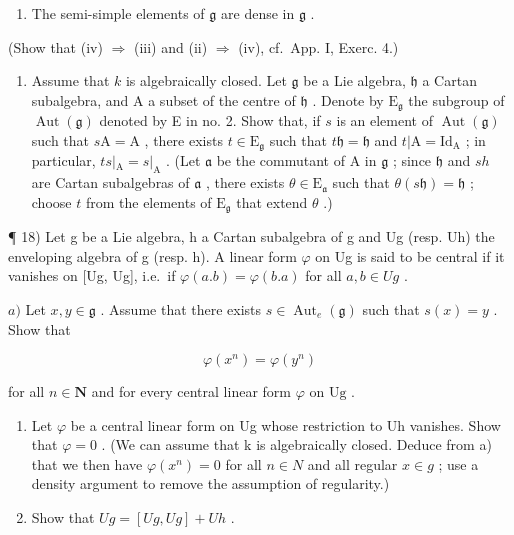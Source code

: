 \begin{enumerate}
\def\labelenumi{(\roman{enumi})}
\setcounter{enumi}{3}
\tightlist
\item
  The semi-simple elements of \(\mathfrak{g}\) are dense in \(\mathfrak{g}\) .
\end{enumerate}

(Show that (iv) \(\Longrightarrow\) (iii) and (ii) \(\Longrightarrow\) (iv), cf.~App. I, Exerc. 4.)

\begin{enumerate}
\def\labelenumi{\arabic{enumi})}
\setcounter{enumi}{16}
\tightlist
\item
  Assume that \(k\) is algebraically closed. Let \(\mathfrak{g}\) be a Lie algebra, \(\mathfrak{h}\) a Cartan subalgebra, and A a subset of the centre of \(\mathfrak{h}\) . Denote by \(\mathrm{E}_{\mathfrak{g}}\) the subgroup of \(\operatorname{Aut}(\mathfrak{g})\) denoted by E in no. 2. Show that, if \(s\) is an element of \(\operatorname{Aut}(\mathfrak{g})\) such that \(s\mathrm{A} = \mathrm{A}\) , there exists \(t \in \mathrm{E}_{\mathfrak{g}}\) such that \(t\mathfrak{h} = \mathfrak{h}\) and \(t|\mathrm{A} = \mathrm{Id}_{\mathrm{A}}\) ; in particular, \(ts|_{\mathrm{A}} = s|_{\mathrm{A}}\) . (Let \(\mathfrak{a}\) be the commutant of A in \(\mathfrak{g}\) ; since \(\mathfrak{h}\) and \(sh\) are Cartan subalgebras of \(\mathfrak{a}\) , there exists \(\theta \in \mathrm{E}_{\mathfrak{a}}\) such that \(\theta(s\mathfrak{h}) = \mathfrak{h}\) ; choose \(t\) from the elements of \(\mathrm{E}_{\mathfrak{g}}\) that extend \(\theta\) .)
\end{enumerate}

¶ 18) Let g be a Lie algebra, h a Cartan subalgebra of g and Ug (resp. Uh) the enveloping algebra of g (resp. h). A linear form \(\varphi\) on Ug is said to be central if it vanishes on {[}Ug, Ug{]}, i.e.~if \(\varphi(a.b) = \varphi(b.a)\) for all \(a, b \in Ug\) .

\(a)\) Let \(x, y \in \mathfrak{g}\) . Assume that there exists \(s \in \operatorname{Aut}_e(\mathfrak{g})\) such that \(s(x) = y\) . Show that

\[
\varphi (x ^ {n}) = \varphi (y ^ {n})
\]

for all \(n \in \mathbf{N}\) and for every central linear form \(\varphi\) on \(\mathrm{Ug}\) .

\begin{enumerate}
\def\labelenumi{\alph{enumi})}
\setcounter{enumi}{1}
\item
  Let \(\varphi\) be a central linear form on Ug whose restriction to Uh vanishes. Show that \(\varphi = 0\) . (We can assume that k is algebraically closed. Deduce from a) that we then have \(\varphi(x^{n}) = 0\) for all \(n \in N\) and all regular \(x \in g\) ; use a density argument to remove the assumption of regularity.)
\item
  Show that \(Ug = [Ug, Ug] + Uh\) .
\end{enumerate}

